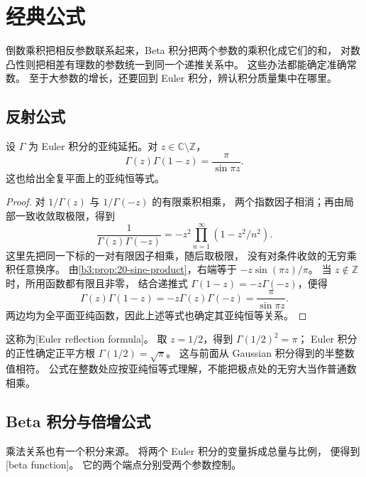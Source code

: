 \section{经典公式}
\label{b3:sec:2104}

倒数乘积把相反参数联系起来，Beta 积分把两个参数的乘积化成它们的和，
对数凸性则把相差有理数的参数统一到同一个递推关系中。
这些办法都能确定准确常数。
至于大参数的增长，还要回到 Euler 积分，辨认积分质量集中在哪里。

\subsection{反射公式}
\label{b3:subsec:210401}

\begin{theorem}\label{b3:thm:21-reflection}
设 \(\Gamma\) 为 Euler 积分的亚纯延拓。对 \(z\in\mathbb C\setminus\mathbb Z\)，
\[
 \Gamma(z)\Gamma(1-z)=\frac\pi{\sin\pi z}.
\]
这也给出全复平面上的亚纯恒等式。
\end{theorem}
\begin{proof}
对 \(1/\Gamma(z)\) 与 \(1/\Gamma(-z)\) 的有限乘积相乘，
两个指数因子相消；再由局部一致收敛取极限，得到
\[
 \frac1{\Gamma(z)\Gamma(-z)}
 =-z^2\prod_{n=1}^\infty(1-z^2/n^2).
\]
这里先把同一下标的一对有限因子相乘，随后取极限，
没有对条件收敛的无穷乘积任意换序。
由\cref{b3:prop:20-sine-product}，右端等于
\(-z\sin(\pi z)/\pi\)。
当 \(z\notin\mathbb Z\) 时，所用函数都有限且非零，
结合递推式 \(\Gamma(1-z)=-z\Gamma(-z)\)，便得
\[
 \Gamma(z)\Gamma(1-z)
 =-z\Gamma(z)\Gamma(-z)=\frac\pi{\sin\pi z}.
\]
两边均为全平面亚纯函数，因此上述等式也确定其亚纯恒等关系。
\end{proof}

这称为[Euler reflection formula]。
取 \(z=1/2\)，得到 \(\Gamma(1/2)^2=\pi\)；
Euler 积分的正性确定正平方根 \(\Gamma(1/2)=\sqrt\pi\)。
这与前面从 Gaussian 积分得到的半整数值相符。
公式在整数处应按亚纯恒等式理解，不能把极点处的无穷大当作普通数相乘。

\subsection{Beta 积分与倍增公式}
\label{b3:subsec:210402}

乘法关系也有一个积分来源。
将两个 Euler 积分的变量拆成总量与比例，
便得到[beta function]。
它的两个端点分别受两个参数控制。

